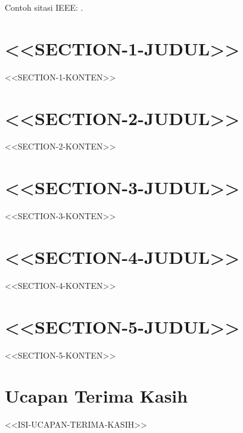 \documentclass[journal]{IEEEtran}
\begin{document}
Contoh sitasi IEEE: \cite{contoh_artikel_jurnal}.

\section{<<SECTION-1-JUDUL>>}

<<SECTION-1-KONTEN>>

\section{<<SECTION-2-JUDUL>>}

<<SECTION-2-KONTEN>>

\section{<<SECTION-3-JUDUL>>}

<<SECTION-3-KONTEN>>

\section{<<SECTION-4-JUDUL>>}

<<SECTION-4-KONTEN>>

\section{<<SECTION-5-JUDUL>>}

<<SECTION-5-KONTEN>>

\section*{Ucapan Terima Kasih}

<<ISI-UCAPAN-TERIMA-KASIH>>



\end{document}
